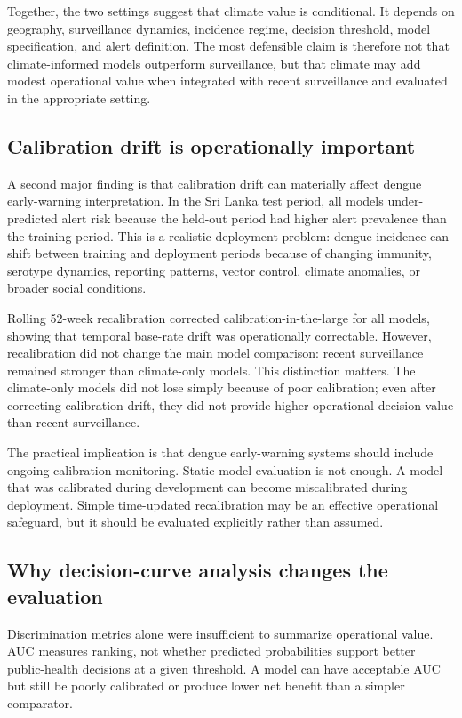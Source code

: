 \documentclass[11pt,a4paper]{article}
\begin{document}
Together, the two settings suggest that climate value is conditional. It depends on geography, surveillance dynamics, incidence regime, decision threshold, model specification, and alert definition. The most defensible claim is therefore not that climate-informed models outperform surveillance, but that climate may add modest operational value when integrated with recent surveillance and evaluated in the appropriate setting.

\subsection{Calibration drift is operationally important}
\label{subsec:calibration-discussion}

A second major finding is that calibration drift can materially affect dengue early-warning interpretation. In the Sri Lanka test period, all models under-predicted alert risk because the held-out period had higher alert prevalence than the training period. This is a realistic deployment problem: dengue incidence can shift between training and deployment periods because of changing immunity, serotype dynamics, reporting patterns, vector control, climate anomalies, or broader social conditions.

Rolling 52-week recalibration corrected calibration-in-the-large for all models, showing that temporal base-rate drift was operationally correctable. However, recalibration did not change the main model comparison: recent surveillance remained stronger than climate-only models. This distinction matters. The climate-only models did not lose simply because of poor calibration; even after correcting calibration drift, they did not provide higher operational decision value than recent surveillance.

The practical implication is that dengue early-warning systems should include ongoing calibration monitoring. Static model evaluation is not enough. A model that was calibrated during development can become miscalibrated during deployment. Simple time-updated recalibration may be an effective operational safeguard, but it should be evaluated explicitly rather than assumed.

\subsection{Why decision-curve analysis changes the evaluation}
\label{subsec:dca-discussion}

Discrimination metrics alone were insufficient to summarize operational value. AUC measures ranking, not whether predicted probabilities support better public-health decisions at a given threshold. A model can have acceptable AUC but still be poorly calibrated or produce lower net benefit than a simpler comparator.
\end{document}
